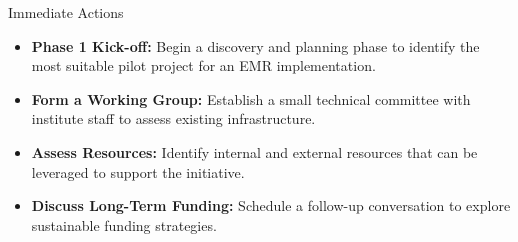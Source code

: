 \documentclass{beamer}
\begin{document}
\begin{frame}{Immediate Actions}
    \begin{itemize}
        \item \textbf{Phase 1 Kick-off:} Begin a discovery and planning phase to identify the most suitable pilot project for an EMR implementation.
        \item \textbf{Form a Working Group:} Establish a small technical committee with institute staff to assess existing infrastructure.
        \item \textbf{Assess Resources:} Identify internal and external resources that can be leveraged to support the initiative.
        \item \textbf{Discuss Long-Term Funding:} Schedule a follow-up conversation to explore sustainable funding strategies.
    \end{itemize}
\end{frame}
\end{document}
